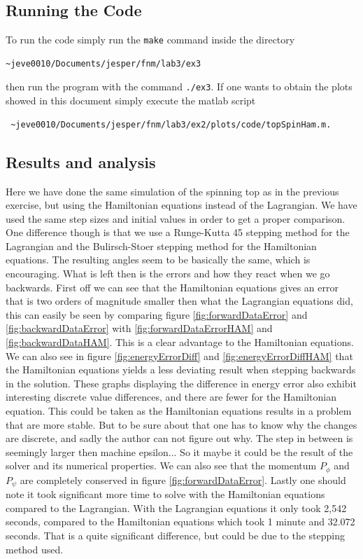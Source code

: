 \documentclass[11pt]{article}
\begin{document}
\subsection{Running the Code}
To run the code simply run the \verb+make+ command inside the directory 
\begin{verbatim}
~jeve0010/Documents/jesper/fnm/lab3/ex3
\end{verbatim}
 then run the program with the command \verb+./ex3+. If one wants to obtain the plots showed in this document simply execute the matlab script 
\begin{verbatim}
 ~jeve0010/Documents/jesper/fnm/lab3/ex2/plots/code/topSpinHam.m.
\end{verbatim}

\subsection{Results and analysis}
Here we have done the same simulation of the spinning top as in the previous exercise, but using the Hamiltonian equations instead of the Lagrangian. We have used the same step sizes and initial values in order to get a proper comparison. One difference though is that we use a Runge-Kutta 45  stepping method for the Lagrangian and the Bulirsch-Stoer stepping method for the Hamiltonian equations. The resulting angles seem to be basically the same, which is encouraging. What is left then is the errors and how they react when we go backwards. First off we can see that the Hamiltonian equations gives an error that is two orders of magnitude smaller then what the Lagrangian equations did, this can easily be seen by comparing figure \ref{fig:forwardDataError} and \ref{fig:backwardDataError} with \ref{fig:forwardDataErrorHAM} and \ref{fig:backwardDataHAM}. This is a clear advantage to the Hamiltonian equations. We can also see in figure \ref{fig:energyErrorDiff} and \ref{fig:energyErrorDiffHAM} that the Hamiltonian equations yields a less deviating result when stepping backwards in the solution. These graphs displaying the difference in energy error also exhibit interesting discrete value differences, and there are fewer for the Hamiltonian equation. This could be taken as the Hamiltonian equations results in a problem that are more stable. But to be sure about that one has to know why the changes are discrete, and sadly the author can not figure out why. The step in between is seemingly larger then machine epsilon... So it maybe it could be the result of the solver and its numerical properties. We can also see that the momentum $P_{\phi}$ and $P_{\psi}$ are completely conserved in figure \ref{fig:forwardDataError}. Lastly one should note it took significant more time to solve with the Hamiltonian equations compared to the Lagrangian. With the Lagrangian equations it only took 2,542 seconds, compared to the Hamiltonian equations which took 1 minute and 32.072 seconds. That is a quite significant difference, but could be due to the stepping method used.
\end{document}
